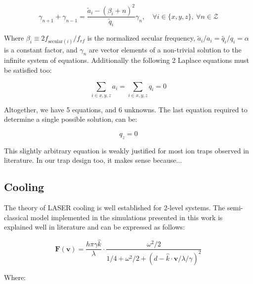 \begin{equation}
	\gamma_{n+1} + \gamma_{n-1} = \frac{\tilde{a}_i - \left(\beta_i + n\right)^2}{\tilde{q}_i} \gamma_n,\quad \forall i\in\{x,y,z\},\ \forall n\in\mathcal{Z}
\end{equation}

Where $\beta_i \equiv 2 f_{\mathrm{secular}(i)}/f_{rf}$ is the normalized secular frequency, $\tilde{a}_i/a_i = \tilde{q_i}/q_i = \alpha$ is a constant factor, and $\gamma_n$ are vector elements of a non-trivial solution to the infinite system of equations. Additionally the following 2 Laplace equations must be satisfied too:

\begin{equation}
	\sum_{i\in{x,y,z}} a_i = \sum_{i\in{x,y,z}} q_i = 0
\end{equation}

Altogether, we have 5 equations, and 6 unknowns. The last equation required to determine a single possible solution, can be:

\begin{equation}
	q_z = 0
\end{equation}

This slightly arbitrary equation is weakly justified for most ion traps observed in literature. In our trap design too, it makes sense because...


\subsection{Cooling}

The theory of LASER cooling is well established for 2-level systems. The semi-classical model implemented in the simulations presented in this work is explained well in literature\cite{TannoudjiCooling,SteckCooling} and can be expressed as follows:

\begin{equation}
	\mathbf{F}(\mathbf{v}) = \frac{h \pi \gamma \hat{k}}{\lambda} \cdot \frac{\omega^2/2}{1/4 + \omega^2/2 + (d - \hat{k}\cdot\mathbf{v}/\lambda/\gamma)^2}
\end{equation}

Where:

